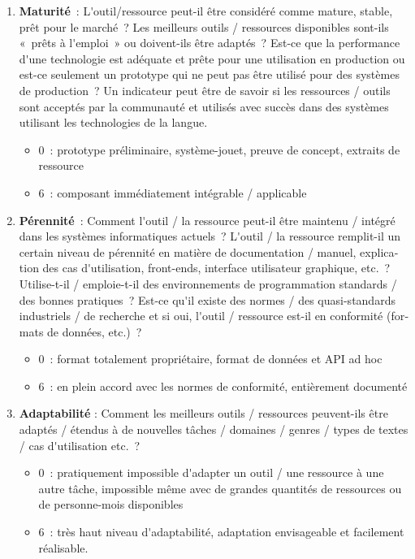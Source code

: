 \documentclass[]{../metanetpaper}
\begin{document}
\begin{french}
\begin{multicols}{2}
\begin{enumerate}
\item {\bf Maturité}~: L{\mbox '}outil/ressource peut-il être considéré comme mature, stable, prêt pour le marché~? Les meilleurs outils / ressources disponibles sont-ils «~prêts à l{\mbox '}emploi~» ou doivent-ils être adaptés~? Est-ce que la performance d{\mbox '}une technologie est adéquate et prête pour une utilisation en production ou est-ce seulement un prototype qui ne peut pas être utilisé pour des systèmes de production~? Un indicateur peut être de savoir si les ressources / outils sont acceptés par la communauté et utilisés avec succès dans des systèmes utilisant les technologies de la langue.  
     \begin{itemize}
      \item 0~: prototype préliminaire, système-jouet, preuve de concept, extraits de ressource
      \item 6~: composant immédiatement intégrable / applicable
      \end{itemize}

\item {\bf Pérennité}~: Comment l{\mbox '}outil / la ressource peut-il être maintenu / intégré dans les systèmes informatiques actuels~? L{\mbox '}outil / la ressource remplit-il un certain niveau de pérennité en matière de documentation / manuel, explication des cas d{\mbox '}utilisation, front-ends, interface utilisateur graphique, etc.~? Utilise-t-il / emploie-t-il des environnements de programmation standards / des bonnes pratiques~? Est-ce qu{\mbox '}il existe des normes / des quasi-standards industriels / de recherche et si oui, l{\mbox '}outil / ressource est-il en conformité (formats de données, etc.)~? 
      \begin{itemize}
      \item 0~: format totalement propriétaire, format de données et API ad hoc
      \item 6~: en plein accord avec les normes de conformité, entièrement documenté
      \end{itemize}

\item {\bf Adaptabilité} : Comment les meilleurs outils / ressources peuvent-ils être adaptés / étendus à de nouvelles tâches / domaines / genres / types de textes / cas d{\mbox '}utilisation etc.~? 
\begin{itemize}
      \item 0~: pratiquement impossible d{\mbox '}adapter un outil / une ressource à une autre tâche, impossible même avec de grandes quantités de ressources ou de personne-mois disponibles
      \item 6~: très haut niveau d{\mbox '}adaptabilité, adaptation envisageable et facilement réalisable.
      \end{itemize}
\end{enumerate}


\end{multicols}
\end{french}
\end{document}
